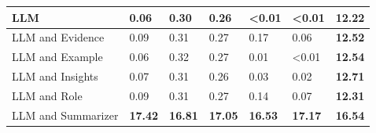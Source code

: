 \begin{tabular}{|l|l|l|l|l|l|l|}
 \hline
 LLM & 0.06 & 0.30 & 0.26 & \textless{}0.01 & \textless{}0.01 & \textbf{12.22} \\
 \hline
 LLM and Evidence & 0.09 & 0.31 & 0.27 & 0.17 & 0.06 & \textbf{12.52} \\
 \hline
 LLM and Example & 0.06 & 0.32 & 0.27 & 0.01 & \textless{}0.01 & \textbf{12.54} \\
 \hline
 LLM and Insights & 0.07 & 0.31 & 0.26 & 0.03 & 0.02 & \textbf{12.71} \\
 \hline
 LLM and Role & 0.09 & 0.31 & 0.27 & 0.14 & 0.07 & \textbf{12.31} \\
 \hline
 LLM and Summarizer & \textbf{17.42} & \textbf{16.81} & \textbf{17.05} & \textbf{16.53} & \textbf{17.17} & \textbf{16.54} \\
\hline
\end{tabular}
